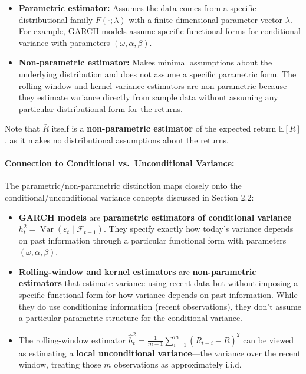 \documentclass[11pt]{amsart}
\begin{document}
\begin{itemize}[noitemsep,left=0pt]
	\item \textbf{Parametric estimator:} Assumes the data comes from a specific distributional family $F(\cdot; \lambda)$ with a finite-dimensional parameter vector $\lambda$. For example, GARCH models assume specific functional forms for conditional variance with parameters $(\omega, \alpha, \beta)$.
	\item \textbf{Non-parametric estimator:} Makes minimal assumptions about the underlying distribution and does not assume a specific parametric form. The rolling-window and kernel variance estimators are non-parametric because they estimate variance directly from sample data without assuming any particular distributional form for the returns.
\end{itemize}

Note that $\bar R$ itself is a \textbf{non-parametric estimator} of the expected return $\mathbb{E}[R]$, as it makes no distributional assumptions about the returns.

\paragraph{Connection to Conditional vs.\ Unconditional Variance:} The parametric/non-parametric distinction maps closely onto the conditional/unconditional variance concepts discussed in Section 2.2:
\begin{itemize}[noitemsep,left=0pt]
	\item \textbf{GARCH models} are \textbf{parametric estimators of conditional variance} $h_t^2 = \operatorname{Var}(\varepsilon_t \mid \mathcal{F}_{t-1})$. They specify exactly how today's variance depends on past information through a particular functional form with parameters $(\omega, \alpha, \beta)$.
	\item \textbf{Rolling-window and kernel estimators} are \textbf{non-parametric estimators} that estimate variance using recent data but without imposing a specific functional form for how variance depends on past information. While they do use conditioning information (recent observations), they don't assume a particular parametric structure for the conditional variance.
	\item The rolling-window estimator $\hat h_t^2 = \frac{1}{m-1}\sum_{i=1}^m (R_{t-i} - \bar{R})^2$ can be viewed as estimating a \textbf{local unconditional variance}—the variance over the recent window, treating those $m$ observations as approximately i.i.d.
\end{itemize}
\end{document}

